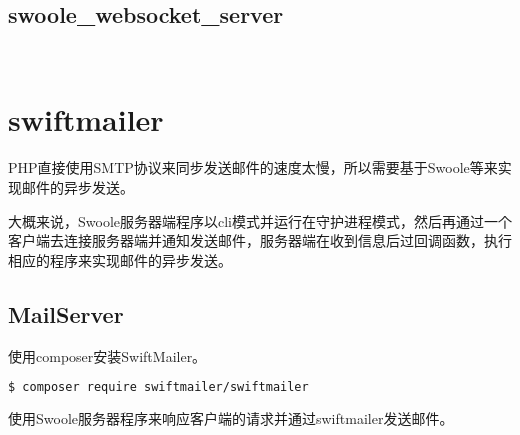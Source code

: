 \subsection{swoole\_websocket\_server}


\begin{lstlisting}[language=bash]

\end{lstlisting}




\begin{lstlisting}[language=bash]

\end{lstlisting}


\section{swiftmailer}


PHP直接使用SMTP协议来同步发送邮件的速度太慢，所以需要基于Swoole等来实现邮件的异步发送。



大概来说，Swoole服务器端程序以cli模式并运行在守护进程模式，然后再通过一个客户端去连接服务器端并通知发送邮件，服务器端在收到信息后过回调函数，执行相应的程序来实现邮件的异步发送。

\subsection{MailServer}

使用composer安装SwiftMailer。

\begin{lstlisting}[language=bash]
$ composer require swiftmailer/swiftmailer
\end{lstlisting}

使用Swoole服务器程序来响应客户端的请求并通过swiftmailer发送邮件。


